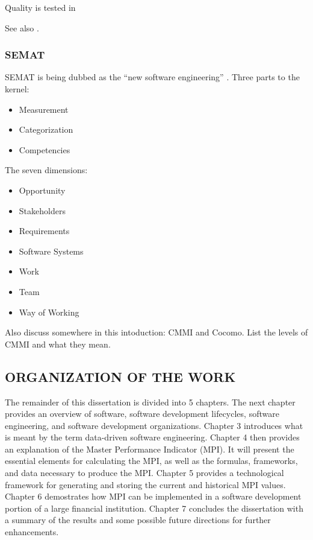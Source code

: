 \documentclass[SDSUThesis.tex]{subfiles}
\begin{document}
Quality is tested in \cite{Miguel2014}

See also \cite{Buse2010}.

\subsubsection{SEMAT}


SEMAT is being dubbed as the ``new software engineering'' \cite{Jacobson2014}.
Three parts to the kernel:
\begin{itemize}
\item Measurement
\item Categorization
\item Competencies
\end{itemize}

The seven dimensions:
\begin{itemize}
\item Opportunity
\item Stakeholders
\item Requirements
\item Software Systems
\item Work
\item Team
\item Way of Working
\end{itemize}

Also discuss somewhere in this intoduction: CMMI and Cocomo.
List the levels of CMMI and what they mean.



\subsection{ORGANIZATION OF THE WORK}

The remainder of this dissertation is divided into 5 chapters.  The next chapter provides
an overview of software, software development lifecycles, software engineering, and software
development organizations.  Chapter 3 introduces what is meant by the term data-driven
software engineering. Chapter 4 then provides an explanation of the Master Performance 
Indicator (MPI).  It will present the essential elements for calculating the MPI, as well
as the formulas, frameworks, and data necessary to produce the MPI. Chapter 5 provides
a technological framework for generating and storing the current and historical MPI values.
Chapter 6 demostrates how MPI can be implemented in a software development portion of 
a large financial institution.  Chapter 7 concludes the dissertation with a summary
of the results and some possible future directions for further enhancements. 
\end{document}
